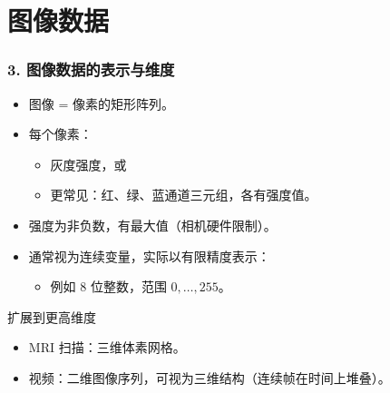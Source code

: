 \documentclass[t,aspectratio=169]{beamer} %
\begin{document}
\section{图像数据}

\begin{frame}
    \frametitle{3. 图像数据的表示与维度}
    \begin{itemize}
        \item 图像 = 像素的\alert{矩形阵列}。
        \item 每个像素：
        \begin{itemize}
            \item 灰度强度，或
            \item 更常见：\alert{红、绿、蓝通道}三元组，各有强度值。
        \end{itemize}
        \item 强度为\alert{非负数}，有最大值（相机硬件限制）。
        \item 通常视为\alert{连续变量}，实际以有限精度表示：
        \begin{itemize}
            \item 例如 8 位整数，范围 $0, \dots, 255$。
        \end{itemize}
    \end{itemize}
    \begin{block}{扩展到更高维度}
        \begin{itemize}
            \item \alert{MRI 扫描}：三维\alert{体素}网格。
            \item \alert{视频}：二维图像序列，可视为三维结构（连续帧在时间上堆叠）。
        \end{itemize}
    \end{block}
\end{frame}
\end{document}
